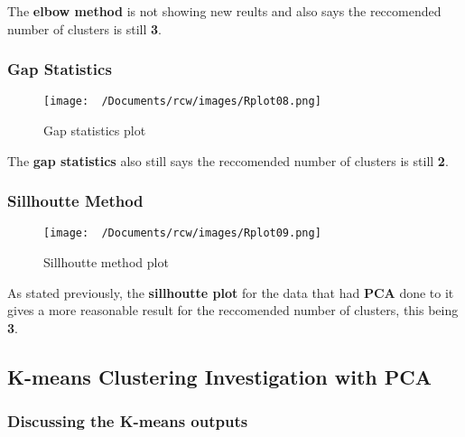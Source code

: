 \documentclass[11pt]{article}
\begin{document}
The \textbf{elbow method} is not showing new reults and also says the reccomended number of clusters is still \textbf{3}.
\subsubsection{Gap Statistics}
\begin{figure}[H]
  \centering
  \texttt{[image: ~/Documents/rcw/images/Rplot08.png]}
  \caption{Gap statistics plot}
\end{figure}

The \textbf{gap statistics} also still says the reccomended number of clusters is still \textbf{2}.

\subsubsection{Sillhoutte  Method}
\begin{figure}[H]
  \centering
  \texttt{[image: ~/Documents/rcw/images/Rplot09.png]}
  \caption{Sillhoutte method plot}
\end{figure}

As stated previously, the \textbf{sillhoutte plot} for the data that had \textbf{PCA} done to it gives a more reasonable result for the reccomended number of clusters, this being 
\textbf{3}.

\subsection{K-means Clustering Investigation with PCA}
\subsubsection{Discussing the K-means outputs}
\end{document}
